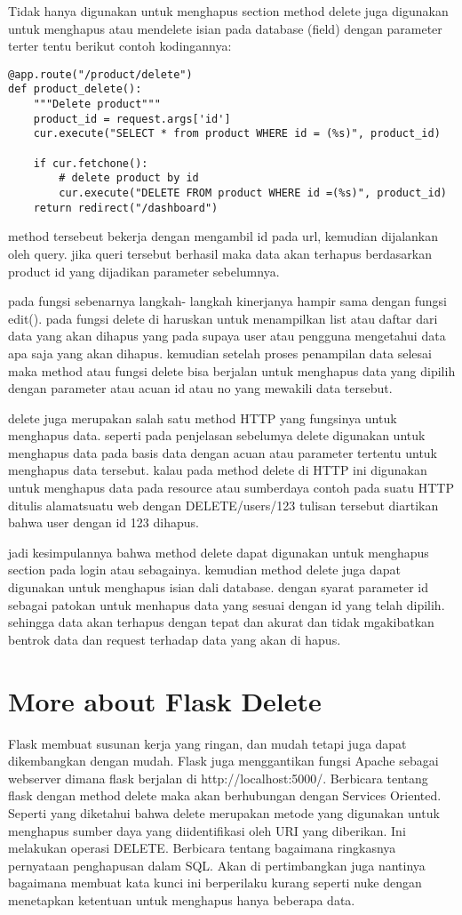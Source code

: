 Tidak hanya digunakan untuk menghapus section method delete juga digunakan untuk menghapus atau mendelete isian pada 
database (field) dengan parameter terter tentu berikut contoh kodingannya:
\begin{verbatim}
@app.route("/product/delete")
def product_delete():
    """Delete product"""
    product_id = request.args['id']
    cur.execute("SELECT * from product WHERE id = (%s)", product_id)

    if cur.fetchone():
        # delete product by id
        cur.execute("DELETE FROM product WHERE id =(%s)", product_id)
    return redirect("/dashboard")
\end{verbatim}
method tersebeut bekerja dengan mengambil id pada url, kemudian dijalankan oleh query. jika queri tersebut berhasil maka
data akan terhapus berdasarkan product id yang dijadikan parameter sebelumnya.

pada fungsi sebenarnya langkah- langkah kinerjanya hampir sama dengan fungsi edit().
pada fungsi delete di haruskan untuk menampilkan list atau daftar dari data yang akan dihapus
yang pada supaya user atau pengguna mengetahui data apa saja yang akan dihapus. kemudian 
setelah proses penampilan data selesai maka method atau fungsi delete bisa berjalan untuk menghapus data 
yang dipilih dengan parameter atau acuan id atau no yang mewakili data tersebut.

delete juga merupakan salah satu method HTTP yang fungsinya untuk menghapus data. seperti pada penjelasan sebelumya 
delete digunakan untuk menghapus data pada basis data dengan acuan atau parameter tertentu untuk menghapus data tersebut.
kalau pada method delete di HTTP ini digunakan untuk menghapus data pada resource atau sumberdaya contoh 
pada suatu HTTP ditulis alamatsuatu web dengan DELETE/users/123 tulisan tersebut diartikan bahwa user dengan id 123
dihapus.

jadi kesimpulannya bahwa method delete dapat digunakan untuk menghapus section 
pada login atau sebagainya. kemudian method delete juga dapat digunakan untuk menghapus isian dali database.
dengan syarat parameter id sebagai patokan untuk menhapus data yang sesuai dengan id yang telah dipilih.
sehingga data akan terhapus dengan tepat dan akurat dan tidak mgakibatkan bentrok data dan request terhadap data yang akan di hapus.

\section{More about Flask Delete}
Flask membuat susunan kerja yang ringan, dan mudah tetapi juga dapat dikembangkan dengan mudah. Flask juga menggantikan fungsi Apache sebagai webserver dimana flask berjalan di http://localhost:5000/.  Berbicara tentang flask dengan method delete maka akan berhubungan dengan Services Oriented. Seperti yang diketahui bahwa delete merupakan metode yang digunakan untuk menghapus sumber daya yang diidentifikasi oleh URI yang diberikan. Ini melakukan operasi DELETE. Berbicara tentang bagaimana ringkasnya pernyataan penghapusan dalam SQL. Akan di pertimbangkan juga nantinya bagaimana membuat kata kunci ini berperilaku kurang seperti nuke dengan menetapkan ketentuan untuk menghapus hanya beberapa data\cite{dwyer2016flask}.


